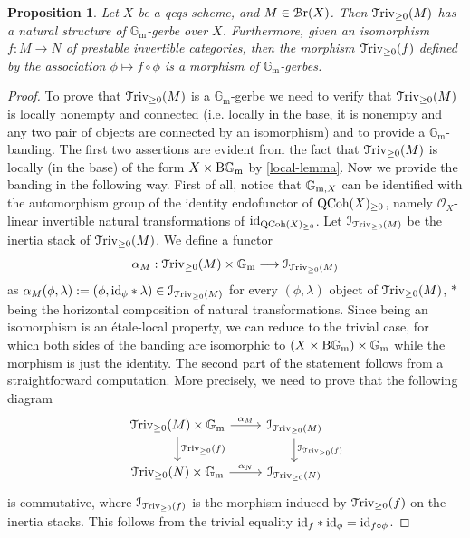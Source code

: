\documentclass[11pt, twoside]{article} %
\numberwithin{equation}{section}
\theoremstyle{plain}
\newtheorem{prop}[thm]{Proposition}
\theoremstyle{definition}
\newcommand{\B}{\textup{B}}
\newcommand{\Gm}{\mathbb G_{\mathrm{m}}}
\newcommand{\id}{\textup{id}}
\newcommand{\QCoh}{\textup{QCoh}}
\newcommand{\BGm}{\textup{B}\Gm}
\newcommand{\Triv}{\mathcal{T}\textup{riv}}
\newcommand{\cO}{{\mathcal O}}
\newcommand{\cBr}{\mathcal{B}\textup{r}}
\newcommand{\cI}{\mathcal I}
\begin{document}
	\begin{prop}\label{triv-gerbe}Let $X$ be a qcqs scheme, and $M\in \cBr(X)$. Then $\Triv_{\geq 0}(M)$ has a natural structure of $\Gm$-gerbe over $X$.
	Furthermore, given an isomorphism $f:M \rightarrow N$ of prestable invertible categories, then the morphism $\Triv_{\geq 0}(f)$ defined by the association $\phi\mapsto f \circ \phi$ is a morphism of $\Gm$-gerbes.\end{prop}
	\begin{proof}
		
		To prove that $\Triv_{\geq 0}(M)$ is a $\Gm$-gerbe we need to verify that $\Triv_{\geq 0}(M)$ is locally nonempty and connected (i.e. locally in the base, it is nonempty and any two pair of objects are connected by an isomorphism) and to provide a $\Gm$-banding. The first two assertions are evident from the fact that $\Triv_{\geq 0}(M)$ is locally (in the base) of the form $X \times \BGm$ by \cref{local-lemma}.
		Now we provide the banding in the following way. First of all, notice that $\mathbb G_{\textup{m},X}$ can be identified with the automorphism group of the identity endofunctor of $\QCoh(X)_{\geq 0}$, namely $\cO_X$-linear invertible natural transformations of $\id_{\QCoh(X)_{\geq 0}}$. Let $\cI_{\Triv_{\geq 0}(M)}$ be the inertia stack of $\Triv_{\geq 0}(M)$. We define a functor 
		$$ \alpha_M: \Triv_{\geq 0}(M) \times \Gm \longrightarrow \cI_{\Triv_{\geq 0}(M)} $$ 
		as $\alpha_M(\phi,\lambda):= (\phi, \id_{\phi} * \lambda) \in \cI_{\Triv_{\geq 0}(M)}$ for every $(\phi,\lambda)$ object of $\Triv_{\geq 0}(M)$, $*$ being the horizontal composition of natural transformations. Since being an isomorphism is an \'etale-local property, we can reduce to the trivial case, for which both sides of the banding are isomorphic to $(X \times \B\Gm) \times \Gm$ while the morphism is just the identity. The second part of the statement follows from a straightforward computation. More precisely, we need to prove that the following diagram 
        $$
        \begin{tikzcd}
        \Triv_{\geq 0}(M) \times \Gm \arrow[d, "\Triv_{\geq 0}(f)"] \arrow[r, "\alpha_M"] & \cI_{\Triv_{\geq 0}(M)} \arrow[d, "\cI_{\Triv_{\geq 0}(f)}"] \\
        \Triv_{\geq 0}(N) \times \Gm \arrow[r, "\alpha_N"]                             & \cI_{\Triv_{\geq 0}(N)}                   
        \end{tikzcd}
        $$
        is commutative, where $\cI_{\Triv_{\geq 0}(f)}$ is the morphism induced by $\Triv_{\geq 0}(f)$ on the inertia stacks. This follows from the trivial equality $\id_{f} * \id_{\phi} = \id_{f \circ \phi}$.
     
	\end{proof}
	
\end{document}
